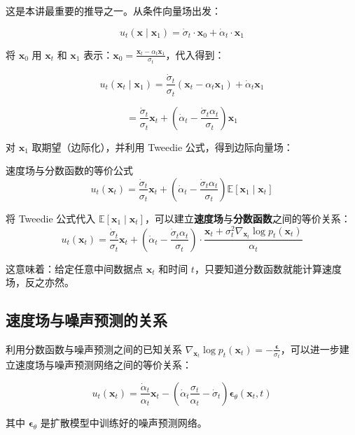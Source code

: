 \documentclass[a4paper]{article}
\begin{document}
这是本讲最重要的推导之一。从条件向量场出发：

$$u_t(\mathbf{x} \mid \mathbf{x}_1) = \dot{\sigma}_t \cdot \mathbf{x}_0 + \dot{\alpha}_t \cdot \mathbf{x}_1$$

将 $\mathbf{x}_0$ 用 $\mathbf{x}_t$ 和 $\mathbf{x}_1$ 表示：$\mathbf{x}_0 = \frac{\mathbf{x}_t - \alpha_t \mathbf{x}_1}{\sigma_t}$，代入得到：

$$u_t(\mathbf{x}_t \mid \mathbf{x}_1) = \frac{\dot{\sigma}_t}{\sigma_t}(\mathbf{x}_t - \alpha_t \mathbf{x}_1) + \dot{\alpha}_t \mathbf{x}_1$$

$$= \frac{\dot{\sigma}_t}{\sigma_t} \mathbf{x}_t + \left(\dot{\alpha}_t - \frac{\dot{\sigma}_t \alpha_t}{\sigma_t}\right) \mathbf{x}_1$$

对 $\mathbf{x}_1$ 取期望（边际化），并利用 Tweedie 公式，得到边际向量场：

\begin{importantbox}{速度场与分数函数的等价公式}
$$u_t(\mathbf{x}_t) = \frac{\dot{\sigma}_t}{\sigma_t} \mathbf{x}_t + \left(\dot{\alpha}_t - \frac{\dot{\sigma}_t \alpha_t}{\sigma_t}\right) \mathbb{E}[\mathbf{x}_1 \mid \mathbf{x}_t]$$

将 Tweedie 公式代入 $\mathbb{E}[\mathbf{x}_1 \mid \mathbf{x}_t]$，可以建立\textbf{速度场}与\textbf{分数函数}之间的等价关系：
$$u_t(\mathbf{x}_t) = \frac{\dot{\sigma}_t}{\sigma_t} \mathbf{x}_t + \left(\dot{\alpha}_t - \frac{\dot{\sigma}_t \alpha_t}{\sigma_t}\right) \cdot \frac{\mathbf{x}_t + \sigma_t^2 \nabla_{\mathbf{x}_t} \log p_t(\mathbf{x}_t)}{\alpha_t}$$

这意味着：给定任意中间数据点 $\mathbf{x}_t$ 和时间 $t$，只要知道分数函数就能计算速度场，反之亦然。
\end{importantbox}

\subsection{速度场与噪声预测的关系}

利用分数函数与噪声预测之间的已知关系 $\nabla_{\mathbf{x}_t} \log p_t(\mathbf{x}_t) = -\frac{\boldsymbol{\epsilon}}{\sigma_t}$，可以进一步建立速度场与噪声预测网络之间的等价关系：

$$u_t(\mathbf{x}_t) = \frac{\dot{\alpha}_t}{\alpha_t} \mathbf{x}_t - \left(\dot{\alpha}_t \frac{\sigma_t}{\alpha_t} - \dot{\sigma}_t\right) \boldsymbol{\epsilon}_\theta(\mathbf{x}_t, t)$$

其中 $\boldsymbol{\epsilon}_\theta$ 是扩散模型中训练好的噪声预测网络。
\end{document}
